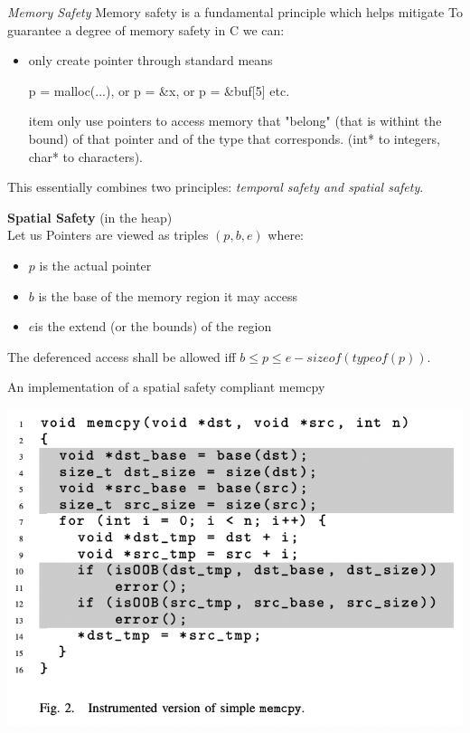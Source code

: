 \documentclass[11pt, oneside]{article}   	%
\begin{document}
\emph{Memory Safety}
Memory safety is a fundamental principle which helps mitigate 
To guarantee a degree of memory safety in C we can:
\begin{itemize}
\item only create pointer through standard means
\begin{center}
p  = malloc(...), or p = \&x, or p = \&buf[5] etc.
\end{center}
item only use pointers to access memory that "belong" (that is withint the bound) of that pointer and of the type that corresponds. (int* to integers, char* to characters).
\end{itemize}
This essentially combines two principles: \emph{temporal safety and spatial safety}.


\textbf{Spatial Safety} (in the heap)\\
Let us 
Pointers are viewed as triples $(p, b, e)$ where:
\begin{itemize}
\item $p$ is the actual pointer
\item $b$ is the base of the memory region it may access
\item $e$is the extend (or the bounds) of the region
\end{itemize}
The deferenced access shall be allowed iff $ b \leq p \leq e - sizeof(typeof(p))$. 

An implementation of a spatial safety compliant memcpy
\begin{center}
\includegraphics[scale = 0.6]{memsef}
\end{center}
\end{document}
